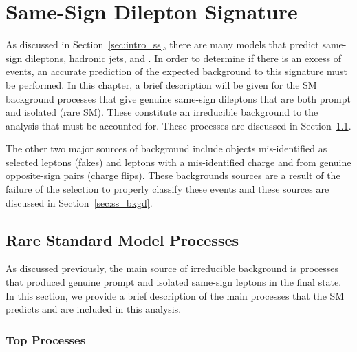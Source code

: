 \chapter{Same-Sign Dilepton Signature}
\label {ch:ss}

As discussed in Section~\ref{sec:intro_ss}, there are many models that predict
same-sign dileptons, hadronic jets, and \met. In order to determine if there is
an excess of events, an accurate prediction of the expected background to this
signature must be performed. In this chapter, a brief description will be given
for the SM background processes that give genuine same-sign dileptons that are
both prompt and isolated (rare SM). These constitute an irreducible background
to the analysis that must be accounted for. These processes are discussed in
Section~\ref{sec:ss_rare}.

The other two major sources of background include objects mis-identified as
selected leptons (fakes) and leptons with a mis-identified charge and from
genuine opposite-sign pairs (charge flips). These backgrounds sources are a
result of the failure of the selection to properly classify these events and
these sources are discussed in Section~\ref{sec:ss_bkgd}.

\section{Rare Standard Model Processes}
\label{sec:ss_rare}

As discussed previously, the main source of irreducible background is processes
that produced genuine prompt and isolated same-sign leptons in the final state.
In this section, we provide a brief description of the main processes that the
SM predicts and are included in this analysis.

\subsection{Top Processes}
\label{sec:ss_rare_top}

